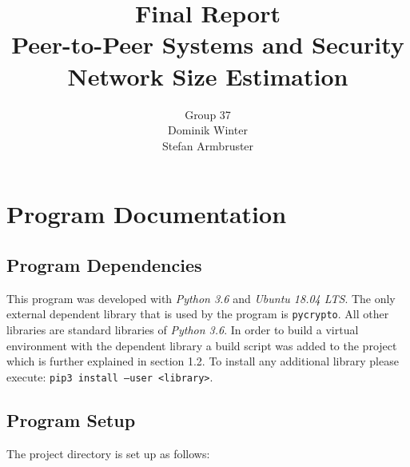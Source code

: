 \documentclass[IN,11pt,oneside,openright,english]{article}
\begin{document}
\title{%
  \Huge \textbf{Final Report} \\
  \vspace{1.5cm} \large \textbf{Peer-to-Peer Systems and Security} \\
    \vspace{0.5cm} \textbf{Network Size Estimation} \vspace{1cm} }

\author{%
	\large Group 37 \\
	\large Dominik Winter \\
	\large Stefan Armbruster}
\date{}
\maketitle

\newpage


\section{Program Documentation}

\subsection{Program Dependencies}
This program was developed with \textit{Python 3.6} and \textit{Ubuntu 18.04 LTS}. \newline
The only external dependent library that is used by the program is \texttt{pycrypto}. All other libraries are standard libraries of \textit{Python 3.6}.
\newline \newline In order to build a virtual environment with the dependent library a build script was added to the project which is further explained in section 1.2.
\newline \newline To install any additional library please execute: \newline \texttt{pip3 install --user <library>}.


\subsection{Program Setup}
The project directory is set up as follows: \newline

\end{document}
